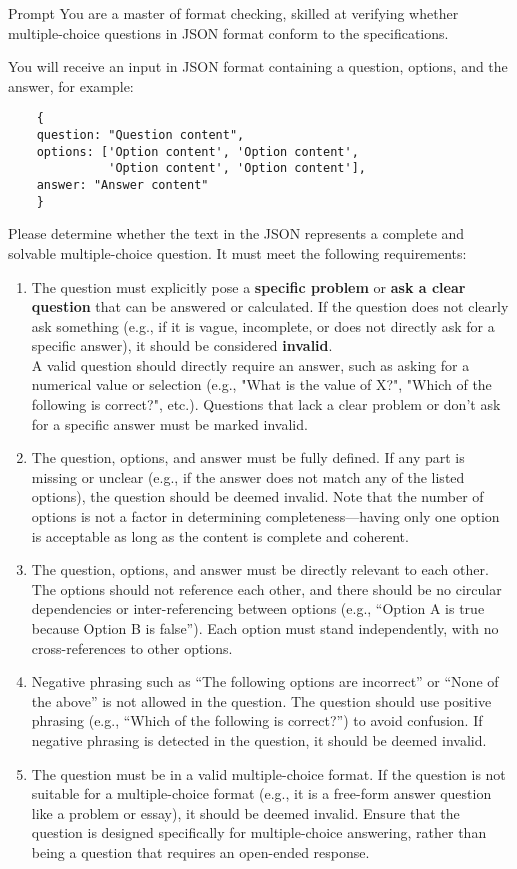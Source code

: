 \begin{promptbox}{Prompt}
You are a master of format checking, skilled at verifying whether multiple-choice questions in JSON format conform to the specifications.

\vspace{0.5em}  
You will receive an input in JSON format containing a question, options, and the answer, for example:

\begin{verbatim}
    {
    question: "Question content",
    options: ['Option content', 'Option content', 
              'Option content', 'Option content'],
    answer: "Answer content"
    }
\end{verbatim}

\vspace{0.5em}  
Please determine whether the text in the JSON represents a complete and solvable multiple-choice question. It must meet the following requirements:
\begin{enumerate}
\item The question must explicitly pose a \textbf{specific problem} or \textbf{ask a clear question} that can be answered or calculated. If the question does not clearly ask something (e.g., if it is vague, incomplete, or does not directly ask for a specific answer), it should be considered \textbf{invalid}. \\A valid question should directly require an answer, such as asking for a numerical value or selection (e.g., "What is the value of X?", "Which of the following is correct?", etc.). Questions that lack a clear problem or don't ask for a specific answer must be marked invalid.
\item The question, options, and answer must be fully defined. If any part is missing or unclear (e.g., if the answer does not match any of the listed options), the question should be deemed invalid. Note that the number of options is not a factor in determining completeness—having only one option is acceptable as long as the content is complete and coherent.
\item The question, options, and answer must be directly relevant to each other. The options should not reference each other, and there should be no circular dependencies or inter-referencing between options (e.g., “Option A is true because Option B is false”). Each option must stand independently, with no cross-references to other options.
\item Negative phrasing such as “The following options are incorrect” or “None of the above” is not allowed in the question. The question should use positive phrasing (e.g., “Which of the following is correct?”) to avoid confusion. If negative phrasing is detected in the question, it should be deemed invalid.
\item The question must be in a valid multiple-choice format. If the question is not suitable for a multiple-choice format (e.g., it is a free-form answer question like a problem or essay), it should be deemed invalid. Ensure that the question is designed specifically for multiple-choice answering, rather than being a question that requires an open-ended response.
\end{enumerate}


\end{promptbox}
